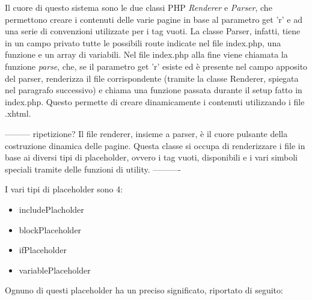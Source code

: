 Il cuore di questo sistema sono le due classi PHP \textit{Renderer} e \textit{Parser}, che permettono creare i contenuti delle varie pagine in base al parametro get 'r' e ad una serie di convenzioni utilizzate per i tag vuoti. La classe Parser, infatti,
tiene in un campo privato tutte le possibili route indicate nel file index.php, una funzione e un array di variabili. Nel file index.php alla fine viene chiamata la funzione \textit{parse}, che, se il parametro get 'r' esiste ed è presente nel campo apposito del parser, 
renderizza il file corrispondente (tramite la classe Renderer, spiegata nel paragrafo successivo) e chiama una funzione passata durante il setup fatto in index.php. Questo permette di creare dinamicamente i contenuti utilizzando i file .xhtml.

--------- ripetizione?
Il file renderer, insieme a parser, è il cuore pulsante della costruzione dinamica delle pagine. Questa classe si occupa di renderizzare i file in base ai diversi tipi di placeholder, ovvero i tag vuoti, disponibili e i vari simboli speciali 
tramite delle funzioni di utility. 
----------


I vari tipi di placeholder sono 4:

\begin{itemize}
    
	\item includePlacholder
    \item blockPlaceholder
	\item ifPlaceholder
	\item variablePlaceholder
	
\end{itemize}

Ognuno di questi placeholder ha un preciso significato, riportato di seguito:

